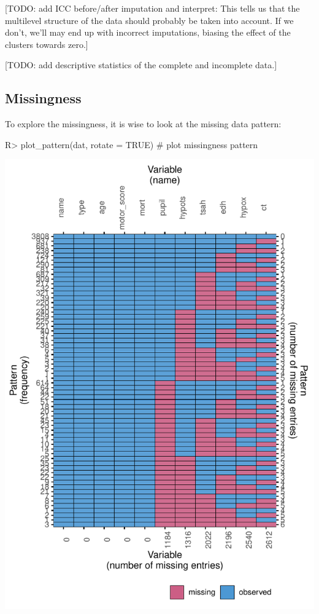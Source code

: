 \documentclass[
]{jss}
\begin{document}
{[}TODO: add ICC before/after imputation and interpret: This tells us
that the multilevel structure of the data should probably be taken into
account. If we don't, we'll may end up with incorrect imputations,
biasing the effect of the clusters towards zero.{]}

{[}TODO: add descriptive statistics of the complete and incomplete
data.{]}

\hypertarget{missingness}{%
\subsection{Missingness}\label{missingness}}

To explore the missingness, it is wise to look at the missing data
pattern:

\begin{CodeChunk}
\begin{CodeInput}
R> plot_pattern(dat, rotate = TRUE)  # plot missingness pattern
\end{CodeInput}


\begin{center}\includegraphics{Imputation_of_Incomplete_Multilevel_Data_files/figure-latex/pattern-1} \end{center}

\end{CodeChunk}
\end{document}
